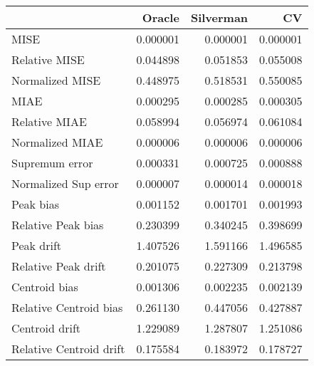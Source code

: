 \begin{tabular}{lrrr}
  \toprule
 & Oracle & Silverman & CV \\ 
  \midrule
MISE & 0.000001 & 0.000001 & 0.000001 \\ 
  Relative MISE & 0.044898 & 0.051853 & 0.055008 \\ 
  Normalized MISE & 0.448975 & 0.518531 & 0.550085 \\ 
  MIAE & 0.000295 & 0.000285 & 0.000305 \\ 
  Relative MIAE & 0.058994 & 0.056974 & 0.061084 \\ 
  Normalized MIAE & 0.000006 & 0.000006 & 0.000006 \\ 
  Supremum error & 0.000331 & 0.000725 & 0.000888 \\ 
  Normalized Sup error & 0.000007 & 0.000014 & 0.000018 \\ 
  Peak bias & 0.001152 & 0.001701 & 0.001993 \\ 
  Relative Peak bias & 0.230399 & 0.340245 & 0.398699 \\ 
  Peak drift & 1.407526 & 1.591166 & 1.496585 \\ 
  Relative Peak drift & 0.201075 & 0.227309 & 0.213798 \\ 
  Centroid bias & 0.001306 & 0.002235 & 0.002139 \\ 
  Relative Centroid bias & 0.261130 & 0.447056 & 0.427887 \\ 
  Centroid drift & 1.229089 & 1.287807 & 1.251086 \\ 
  Relative Centroid drift & 0.175584 & 0.183972 & 0.178727 \\ 
   \bottomrule
\end{tabular}
